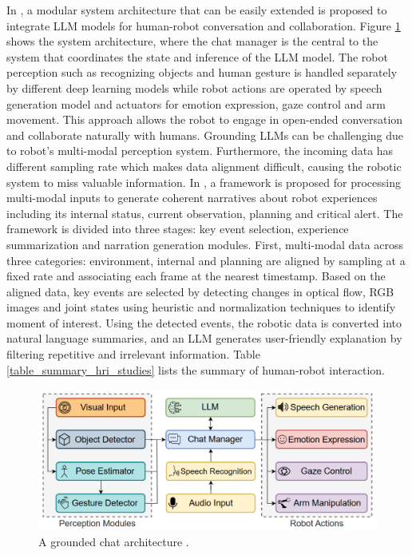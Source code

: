 \documentclass[preprint,12pt]{elsarticle}
\begin{document}
In \citep{allgeuer_when_2024}, a modular system architecture that can be easily extended is proposed to integrate LLM models for human-robot conversation and collaboration. Figure \ref{fig_grounded_chat_architecture} shows the system architecture, where the chat manager is the central to the system that coordinates the state and inference of the LLM model.  The robot perception such as recognizing objects and human gesture is handled separately by different deep learning models while robot actions are operated by speech generation model and actuators for emotion expression, gaze control and arm movement. This approach allows the robot to engage in open-ended conversation and collaborate naturally with humans. Grounding LLMs can be challenging due to robot's multi-modal perception system. Furthermore, the incoming data has different sampling rate which makes data alignment difficult, causing the robotic system to miss valuable information. In \citep{wang_i_2024}, a framework is proposed for processing multi-modal inputs to generate coherent narratives about robot experiences including its internal status, current observation, planning and critical alert. The framework is divided into three stages: key event selection, experience summarization and narration generation modules. First, multi-modal data across three categories: environment, internal and planning are aligned by sampling at a fixed rate and associating each frame at the nearest timestamp. Based on the aligned data, key events are selected by detecting changes in optical flow, RGB images and joint states using heuristic and normalization techniques to identify moment of interest. Using the detected events, the robotic data is converted into natural language summaries, and an LLM generates user-friendly explanation by filtering repetitive and irrelevant information. Table \ref{table_summary_hri_studies} lists the summary of human-robot interaction.

\begin{figure}[h!]
    \centering
    \includegraphics[scale=0.6]{fig_hri_llm_grounding_architecture.png}
    \caption{A grounded chat architecture \citep{allgeuer_when_2024}.}
    \label{fig_grounded_chat_architecture}
\end{figure}
\end{document}
